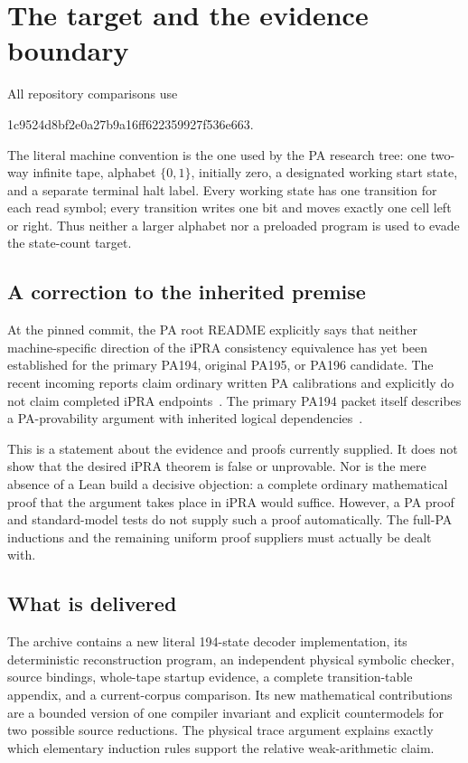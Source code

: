 \documentclass[10pt,letterpaper]{article}
\begin{document}
\section{The target and the evidence boundary}
\label{sec:status}

All repository comparisons use
\begin{center}\small\ttfamily
1c9524d8bf2e0a27b9a16ff622359927f536e663.
\end{center}
The literal machine convention is the one used by the PA research tree:
one two-way infinite tape, alphabet $\{0,1\}$, initially zero, a designated
working start state, and a separate terminal halt label. Every working
state has one transition for each read symbol; every transition writes one
bit and moves exactly one cell left or right. Thus neither a larger
alphabet nor a preloaded program is used to evade the state-count target.

\subsection{A correction to the inherited premise}

At the pinned commit, the PA root README explicitly says that neither
machine-specific direction of the iPRA consistency equivalence has yet been
established for the primary PA194, original PA195, or PA196 candidate.
The recent incoming reports claim ordinary written PA calibrations and
explicitly do not claim completed iPRA endpoints~\cite{repo,incoming}.
The primary PA194 packet itself describes a PA-provability argument with
inherited logical dependencies~\cite{primary}.

This is a statement about the evidence and proofs currently supplied. It
does not show that the desired iPRA theorem is false or unprovable. Nor is
the mere absence of a Lean build a decisive objection: a complete ordinary
mathematical proof that the argument takes place in iPRA would suffice.
However, a PA proof and standard-model tests do not supply such a proof
automatically. The full-PA inductions and the remaining uniform proof
suppliers must actually be dealt with.

\subsection{What is delivered}

The archive contains a new literal 194-state decoder implementation,
its deterministic reconstruction program, an independent physical
symbolic checker, source bindings, whole-tape startup evidence, a complete
transition-table appendix, and a current-corpus comparison. Its new
mathematical contributions are a bounded version of one compiler
invariant and explicit countermodels for two possible source reductions.
The physical trace argument explains exactly which elementary induction
rules support the relative weak-arithmetic claim.
\end{document}
